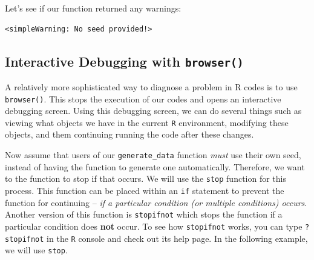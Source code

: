 \documentclass[
]{book}
\newenvironment{Shaded}{\begin{snugshade}}{\end{snugshade}}
\newcommand{\NormalTok}[1]{#1}
\newcommand{\OperatorTok}[1]{\textcolor[rgb]{0.81,0.36,0.00}{\textbf{#1}}}
\begin{document}
Let's see if our function returned any warnings:

\begin{Shaded}
\end{Shaded}

\begin{verbatim}
<simpleWarning: No seed provided!>
\end{verbatim}

\hypertarget{interactive-debugging-with-browser}{%
\subsection{\texorpdfstring{Interactive Debugging with \texttt{browser()}}{Interactive Debugging with browser()}}\label{interactive-debugging-with-browser}}

A relatively more sophisticated way to diagnose a problem in R codes is to use \texttt{browser()}. This stops the execution of our codes and opens an interactive debugging screen. Using this debugging screen, we can do several things such as viewing what objects we have in the current \texttt{R} environment, modifying these objects, and them continuing running the code after these changes.

Now assume that users of our \texttt{generate\_data} function \emph{must} use their own seed, instead of having the function to generate one automatically. Therefore, we want to the function to stop if that occurs. We will use the \texttt{stop} function for this process. This function can be placed within an \texttt{if} statement to prevent the function for continuing -- \emph{if a particular condition (or multiple conditions) occurs}. Another version of this function is \texttt{stopifnot} which stops the function if a particular condition does \textbf{not} occur. To see how \texttt{stopifnot} works, you can type \texttt{?stopifnot} in the \texttt{R} console and check out its help page. In the following example, we will use \texttt{stop}.
\end{document}
